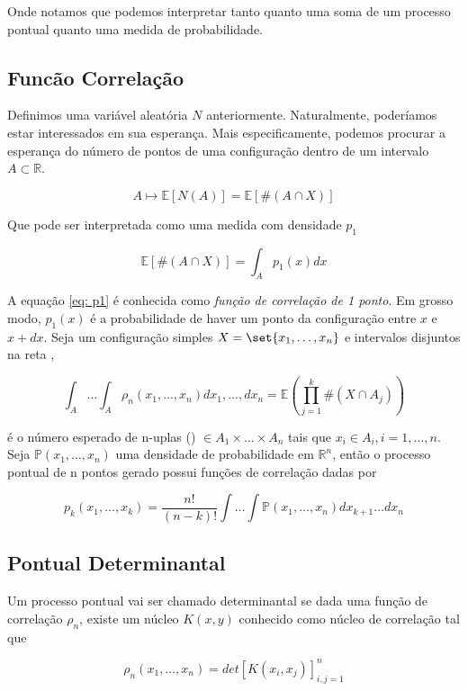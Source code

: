 Onde notamos que podemos interpretar tanto quanto uma soma de um processo pontual quanto uma medida de probabilidade.


\subsection{Funcão Correlação}

Definimos uma variável aleatória $N$ anteriormente. Naturalmente, poderíamos estar interessados em sua esperança. Mais especificamente, podemos procurar a esperança do número de pontos de uma configuração dentro de um intervalo $A \subset \mathbb{R}$.

\[
	A \mapsto \mathbb{E}[N(A)] = \mathbb{E}[\#(A \cap X)]	
\]

Que pode ser interpretada como uma medida com densidade $p_1$

\begin{equation}
	\mathbb{E}[\#(A \cap X)] = \int_{A} p_1(x) dx
	\label{eq: p1}
\end{equation}

A equação \ref{eq: p1} é conhecida como \textit{função de correlação de 1 ponto}. Em grosso modo, $p_1(x)$ é a probabilidade de haver um ponto da configuração entre $x$ e $x+dx$. Seja um configuração simples $X = \set{x_1, \dots, x_n}$ e intervalos disjuntos na reta ,

\[
	\int_A \dots \int_A \rho_n(x_1, \dots, x_n) dx_1, \dots, dx_n = \mathbb{E} \left( \prod_{j=1}^{k} \# (X \cap A_j) \right) 
\]

é o número esperado de n-uplas () $\in A_1 \times \dots \times A_n$ tais que $x_i \in A_i, i=1,\dots,n$. Seja $\mathbb{P}(x_1, \dots, x_n)$ uma densidade de probabilidade em $\mathbb{R}^n$, então o processo pontual de n pontos gerado possui funções de correlação dadas por

\[
	p_k(x_1, \dots, x_k) = \frac{n!}{(n-k)!} \int \dots \int \mathbb{P}(x_1, \dots, x_n) dx_{k+1}\dots dx_n
\]


\subsection{Pontual Determinantal}

Um processo pontual vai ser chamado determinantal se dada uma função de correlação $\rho_n$, existe um núcleo $K(x, y)$ conhecido como núcleo de correlação tal que

\begin{equation}
	\rho_n(x_1, \dots, x_n) = det[K(x_i, x_j)]_{i,j=1}^{n}
	\label{eq: pontualdet}
\end{equation}

